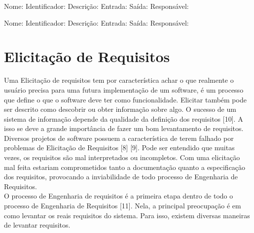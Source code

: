 {{	\onecolumn
		\begin{usecase}

    		\addfield
    			{Nome:}{}
			\addfield
    			{Identificador:}{}
    		\addfield
    			{Descrição:}{}
    		\addfield
    			{Entrada:}{}
    		\addfield
    			{Saída:}{}
			\addfield
    			{Responsável:}{}

		\end{usecase}
	\onecolumn

	\onecolumn
		\begin{usecase}
    		\addtitle{Atividade:}{}

    		\addfield
    			{Nome:}{}
			\addfield
    			{Identificador:}{}
    		\addfield
    			{Descrição:}{}
    		\addfield
    			{Entrada:}{}
    		\addfield
    			{Saída:}{}
			\addfield
    			{Responsável:}{}

		\end{usecase}
	\onecolumn


}

	



\section{Elicitação de Requisitos}
\label{sec:nova_sess_o}

\tab Uma Elicitação de requisitos tem por característica achar o que realmente o usuário precisa para uma futura implementação de um software, é um processo que define o que o software deve ter como funcionalidade. Elicitar também pode ser descrito como descobrir ou obter informação sobre algo. O sucesso de um sistema de informação depende da qualidade da definição dos requisitos [10]. A isso se deve a grande importância de fazer um bom levantamento de requisitos.\\
\tab Diversos projetos de software possuem a característica de terem falhado por problemas de Elicitação de Requisitos [8] [9]. Pode ser entendido que muitas vezes, os requisitos são mal interpretados ou incompletos. Com uma elicitação mal feita estariam comprometidos tanto a documentação quanto a especificação dos requisitos, provocando a inviabilidade de todo processo de Engenharia de Requisitos.\\
\tab O processo de Engenharia de requisitos é a primeira etapa dentro de todo o processo de Engenharia de Requisitos [11]. Nela, a principal preocupação é em como levantar os reais requisitos do sistema. Para isso, existem diversas maneiras de levantar requisitos. \\

}
